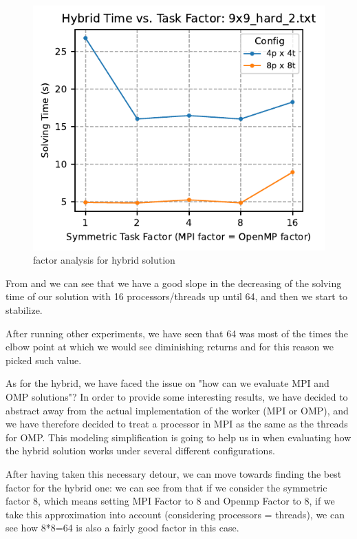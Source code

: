\begin{figure}[htbp]
\centering
\includegraphics[width=0.9\linewidth]{imgs/factor_hybrid_9x9_hard_2.pdf}
\caption{factor analysis for hybrid solution}
\label{fig:factor_analysis_hybrid}
\end{figure}

From  and  we can see that we have a good slope in the decreasing of the solving time of our solution with 16 processors/threads up until 64, and then we start to stabilize. 

After running other experiments, we have seen that 64 was most of the times the elbow point at which we would see diminishing returns and for this reason we picked such value.

As for the hybrid, we have faced the issue on "how can we evaluate MPI and OMP solutions"? In order to provide some interesting results, we have decided to abstract away from the actual implementation of the worker (MPI or OMP), and we have therefore decided to treat a processor in MPI as the same as the threads for OMP. This modeling simplification is going to help us in  when evaluating how the hybrid solution works under several different configurations.

After having taken this necessary detour, we can move towards finding the best factor for the hybrid one: we can see from  that if we consider the symmetric factor 8, which means setting MPI Factor to 8 and Openmp Factor to 8, if we take this approximation into account (considering processors = threads), we can see how 8*8=64 is also a fairly good factor in this case.


